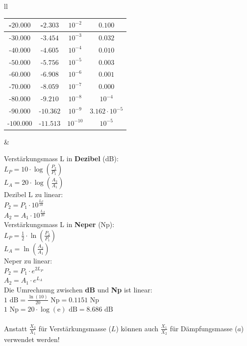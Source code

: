 \begin{tabular}{ll}
{\begin{tabular}{|c|c|c|c|}
	-$20.000$ & -$2.303$ & $10^{-2}$ & $0.100$ \\ \hline
	-$30.000$ & -$3.454$ & $10^{-3}$ & $0.032$ \\ \hline
	-$40.000$ & -$4.605$ & $10^{-4}$ & $0.010$ \\ \hline
	-$50.000$ & -$5.756$ & $10^{-5}$ & $0.003$ \\ \hline
	-$60.000$ & -$6.908$ & $10^{-6}$ & $0.001$ \\ \hline
	-$70.000$ & -$8.059$ & $10^{-7}$ & $0.000$ \\ \hline
	-$80.000$ & -$9.210$ & $10^{-8}$ & $10^{-4}$ \\ \hline
	-$90.000$ & -$10.362$ & $10^{-9}$ & $3.162 \cdot 10^{-5}$ \\ \hline
	-$100.000$ & -$11.513$ & $10^{-10}$ & $10^{-5}$ \\ \hline
	\end{tabular}

	\normalsize
}
& \parbox{11.5cm}{
Verstärkungsmass L in \textbf{Dezibel} (dB):\\
$L_P = 10 \cdot \log \left(\frac {P_2} {P_1}\right)$ \\
$L_A = 20 \cdot \log \left(\frac {A_2} {A_1}\right)$ \\ 

Dezibel L zu linear: \\
$P_2 = P_1 \cdot 10^{\frac{L_P}{10}} $ \\
$A_2 = A_1 \cdot 10^{\frac{L_A}{20}} $ \\

Verstärkungsmass L in \textbf{Neper} (Np):\\
$L_P = \frac {1}{2} \cdot \ln \left(\frac {P_2} {P_1}\right)$\\
$L_A = \ln \left(\frac {A_2} {A_1} \right)$ \\

Neper zu linear: \\
$P_2 = P_1 \cdot e^{2 L_P}$ \\
$A_2 = A_1 \cdot e^{L_A}$ \\

Die Umrechnung zwischen {\bf dB} und {\bf Np} ist linear: \\
$1\mbox{~dB} = \frac {\ln(10)} {20} \mbox{~Np} = 0.1151\mbox{~Np}$ \\
$1\mbox{~Np} = 20 \cdot \log(\mbox{e}) \mbox{~dB} = 8.686\mbox{~dB}$ \\ 
\\
Anstatt $\frac{X_2}{X_1}$ für Verstärkungsmasse ($L$) können auch
$\frac{X_1}{X_2}$ für Dämpfungsmasse ($a$) verwendet werden!

}
\end{tabular}
